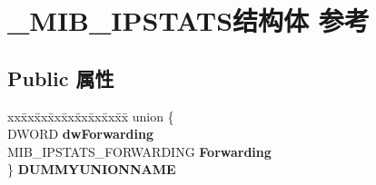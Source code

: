\hypertarget{struct___m_i_b___i_p_s_t_a_t_s}{}\section{\+\_\+\+M\+I\+B\+\_\+\+I\+P\+S\+T\+A\+T\+S结构体 参考}
\label{struct___m_i_b___i_p_s_t_a_t_s}
\subsection*{Public 属性}
\begin{DoxyCompactItemize}
\item 
\mbox{\label{struct___m_i_b___i_p_s_t_a_t_s_a008c0bef6a8a72f9847935f999ef957f}} 
\begin{tabbing}
xx\=xx\=xx\=xx\=xx\=xx\=xx\=xx\=xx\=\kill
union \{\\
\>DWORD {\bfseries dwForwarding}\\
\>MIB\_IPSTATS\_FORWARDING {\bfseries Forwarding}\\
\} {\bfseries DUMMYUNIONNAME}\\


\end{tabbing}
\end{DoxyCompactItemize}
